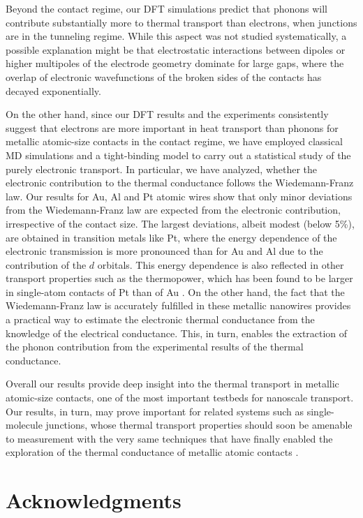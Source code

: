\documentclass[aps,amsmath,amssymb,twocolumn,showpacs]{revtex4-1}
\begin{document}
Beyond the contact regime, our DFT simulations predict
that phonons will contribute substantially more to thermal transport than
electrons, when junctions are in the tunneling regime. While this aspect was
not studied systematically, a possible explanation might be that
electrostatic interactions between dipoles or higher multipoles of the
electrode geometry dominate for large gaps, where the overlap of electronic
wavefunctions of the broken sides of the contacts has decayed exponentially.

On the other hand, since our DFT results and the experiments \cite{Cui2017}
consistently suggest that electrons are more important in heat transport than
phonons for metallic atomic-size contacts in the contact regime, we have
employed classical MD simulations and a tight-binding model to carry out a
statistical study of the purely electronic transport. In particular, we have
analyzed, whether the electronic contribution to the thermal conductance
follows the Wiedemann-Franz law. Our results for Au, Al and Pt atomic wires
show that only minor deviations from the Wiedemann-Franz law are expected from
the electronic contribution, irrespective of the contact size. The largest
deviations, albeit modest (below 5\%), are obtained in transition metals like
Pt, where the energy dependence of the electronic transmission is more
pronounced than for Au and Al due to the contribution of the $d$
orbitals. This energy dependence is also reflected in other
  transport properties such as the thermopower, which has been found to be
  larger in single-atom contacts of Pt than of Au \cite{Evangeli2015}. On the
  other hand, the fact that the Wiedemann-Franz law is accurately fulfilled in
  these metallic nanowires provides a practical way to estimate the electronic
  thermal conductance from the knowledge of the electrical conductance. This,
  in turn, enables the extraction of the phonon contribution from the
  experimental results of the thermal conductance.

Overall our results provide deep insight into the thermal transport in
metallic atomic-size contacts, one of the most important testbeds for
nanoscale transport. Our results, in turn, may prove important for related
systems such as single-molecule junctions, whose thermal transport properties
should soon be amenable to measurement with the very same techniques that have
finally enabled the exploration of the thermal conductance of metallic atomic
contacts \cite{Cui2017,Mosso2017}.

\section{Acknowledgments}
\end{document}
